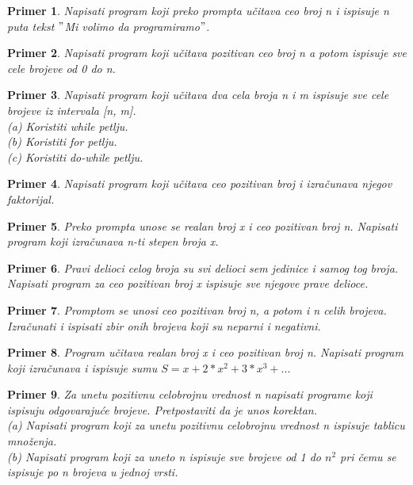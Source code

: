 \documentclass[a4paper]{article}
\newtheorem{primer}{Primer}[section]
\begin{document}
\begin{primer}
Napisati program koji preko prompta učitava ceo broj n i ispisuje n puta
tekst $"$Mi volimo da
programiramo$"$.
\end{primer}

\begin{primer}
Napisati program koji učitava pozitivan ceo broj n a potom
ispisuje sve cele brojeve od 0 do n.
\end{primer}

\begin{primer}
Napisati program koji učitava dva cela broja n i m ispisuje
sve cele brojeve iz intervala [n, m].\\
(a) Koristiti while petlju.\\
(b) Koristiti for petlju.\\
(c) Koristiti do-while petlju.\\
\end{primer}

\begin{primer}
Napisati program koji učitava ceo pozitivan broj i izračunava
njegov faktorijal. 
\end{primer}

\begin{primer}
Preko prompta unose se realan broj x i ceo pozitivan
broj n. Napisati program koji izračunava n-ti stepen broja x.
\end{primer}

\begin{primer}
Pravi delioci celog broja su svi delioci sem jedinice i samog
tog broja. Napisati program za ceo pozitivan broj x ispisuje sve njegove
prave delioce.
\end{primer}

\begin{primer}
Promptom se unosi ceo pozitivan broj n, a potom i n celih
brojeva. Izračunati i ispisati zbir onih brojeva koji su neparni i negativni.
\end{primer}

\begin{primer}
Program učitava realan broj x i ceo pozitivan broj n.
Napisati program koji izračunava i ispisuje sumu $S=x + 2*x^2 + 3*x^3 + ..$.
\end{primer}

\begin{primer}
Za unetu pozitivnu celobrojnu vrednost n napisati programe
koji ispisuju odgovarajuće brojeve. Pretpostaviti da je unos korektan.\\
(a) Napisati program koji za unetu pozitivnu celobrojnu vrednost n ispisuje
tablicu množenja.\\
(b) Napisati program koji za uneto n ispisuje sve brojeve od 1 do $n^2$ pri čemu se ispisuje po n brojeva u jednoj vrsti.\\
\end{primer}
\end{document}
